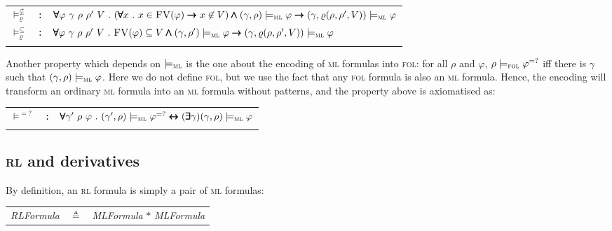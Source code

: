 \documentclass[conference]{IEEEtran}
\newcommand{\eqbydef}{\triangleq}
\newcommand{\FreeVars}{\mathit{\textsc{FV}}}
\newcommand{\ML}{\textsc{ml}\xspace}
\newcommand{\FOL}{\textsc{fol}\xspace}
\newcommand{\RL}{\textsc{rl}\xspace}
\newcommand{\modelsml}{\models_\ML}
\newcommand{\modelsfol}{\models_\FOL}
\newcommand{\coq}[1]{{\small \textit{#1}}}
\newcommand{\coqtt}[1]{{\small \texttt{#1}}}
\newcommand{\cand}{\pmb{\land}}
\newcommand{\cexists}{\pmb{\exists}}
\newcommand{\cforall}{\pmb{\forall}}
\newcommand{\cimplies}{\pmb{\rightarrow}}
\newcommand{\cequiv}{\pmb{\leftrightarrow}}
\newcommand{\extend}[3]{\varrho({#1},{#2},{#3})}
\begin{document}
\noindent
 \begin{minipage}{\textwidth}
\begin{tabular}{lcl}
$\models_{\varrho}^{\not\subseteq}$ & \coqtt{:} &$\cforall \varphi~\gamma~\rho~\rho'~V~.~(\cforall x~.~x \in \FreeVars(\varphi) \cimplies x \not\in V) \cand (\gamma, \rho)\modelsml \varphi \cimplies (\gamma, \extend{\rho}{\rho'}{V})\modelsml \varphi$\\[1ex]
$\models_{\varrho}^\subseteq$ & \coqtt{:} &$\cforall \varphi~\gamma~\rho~\rho'~V~.~\FreeVars(\varphi) \subseteq V\cand (\gamma, \rho')\modelsml \varphi \cimplies (\gamma, \extend{\rho}{\rho'}{V})\modelsml \varphi$\\\\
\end{tabular}
\end{minipage}

\noindent
Another property which depends on $\modelsml$ is the one about the encoding of \ML formulas into \FOL: for all $\rho$ and $\varphi$, $\rho \modelsfol \varphi^{=?}$ iff there is $\gamma$ such that $(\gamma, \rho) \modelsml \varphi$.
Here we do not define \FOL, but we use the fact that any \FOL formula is also an \ML formula. 
Hence, the encoding will transform an ordinary \ML formula into an \ML formula without patterns, and the property above is axiomatised as:\\

\noindent
\begin{minipage}{\textwidth}
\begin{tabular}{lcl}
$\models^{=?}$& \coqtt{:} & $\cforall \gamma'~\rho~\varphi~.~(\gamma', \rho) \modelsml \varphi^{=?} \cequiv (\cexists \gamma) (\gamma, \rho) \modelsml \varphi$ \\\\
\end{tabular}
\end{minipage}


\subsection{\RL and derivatives}
\label{sec:rl}

By definition, an \RL formula is simply a pair of \ML formulas:\\

\noindent
\begin{minipage}{\textwidth}
\begin{tabular}{lcl}
\coq{RLFormula}& $\eqbydef$& \coq{MLFormula} $*$ \coq{MLFormula}\\[1ex]
\end{tabular}
\end{minipage}
\end{document}
